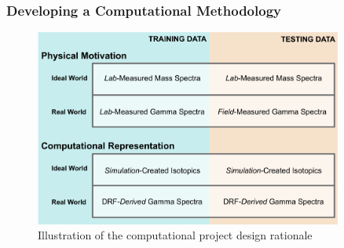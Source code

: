 \begin{frame}
  \frametitle{Developing a Computational Methodology}
  \begin{figure}[h!]
    \centering
    \includegraphics[width=0.9\textwidth]{./figures/project_design.png}
    \caption{Illustration of the computational project design rationale}
  \end{figure}
\end{frame}

